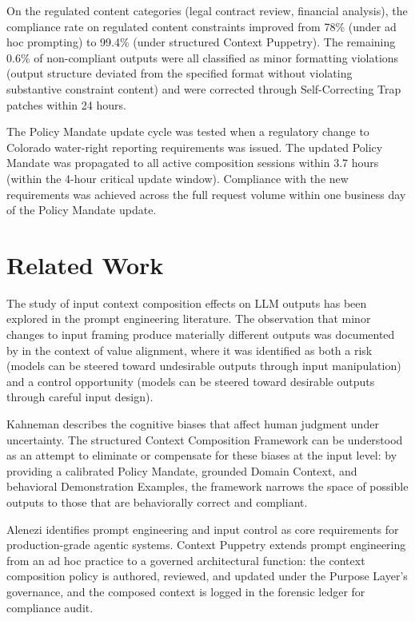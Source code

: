 \documentclass[12pt]{article}
\begin{document}
On the regulated content categories (legal contract review, financial analysis), the compliance rate on regulated content constraints improved from 78\% (under ad hoc prompting) to 99.4\% (under structured Context Puppetry). The remaining 0.6\% of non-compliant outputs were all classified as minor formatting violations (output structure deviated from the specified format without violating substantive constraint content) and were corrected through Self-Correcting Trap patches within 24 hours.

The Policy Mandate update cycle was tested when a regulatory change to Colorado water-right reporting requirements was issued. The updated Policy Mandate was propagated to all active composition sessions within 3.7 hours (within the 4-hour critical update window). Compliance with the new requirements was achieved across the full request volume within one business day of the Policy Mandate update.

\section{Related Work}
The study of input context composition effects on LLM outputs has been explored in the prompt engineering literature. The observation that minor changes to input framing produce materially different outputs was documented by \cite{russell2019} in the context of value alignment, where it was identified as both a risk (models can be steered toward undesirable outputs through input manipulation) and a control opportunity (models can be steered toward desirable outputs through careful input design).

Kahneman \cite{kahneman2011} describes the cognitive biases that affect human judgment under uncertainty. The structured Context Composition Framework can be understood as an attempt to eliminate or compensate for these biases at the input level: by providing a calibrated Policy Mandate, grounded Domain Context, and behavioral Demonstration Examples, the framework narrows the space of possible outputs to those that are behaviorally correct and compliant.

Alenezi \cite{alenezi2026} identifies prompt engineering and input control as core requirements for production-grade agentic systems. Context Puppetry extends prompt engineering from an ad hoc practice to a governed architectural function: the context composition policy is authored, reviewed, and updated under the Purpose Layer's governance, and the composed context is logged in the forensic ledger for compliance audit.
\end{document}
